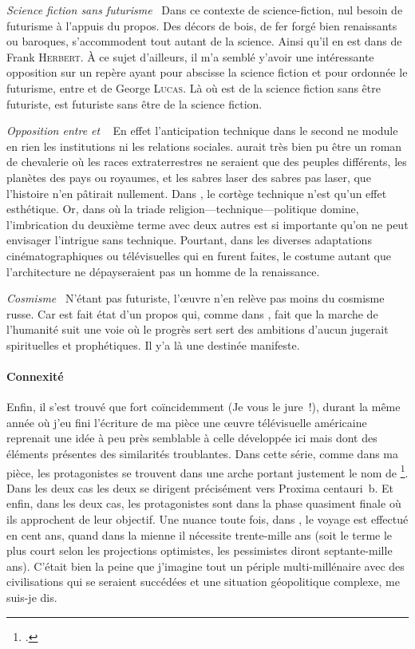   {\em\normalsize Science fiction sans futurisme}~
  Dans ce contexte de science-fiction, nul besoin de futurisme à l’appuis du propos. Des décors de bois, de fer forgé bien renaissants ou baroques, s’accommodent tout autant de la science. Ainsi qu’il en est dans  de Frank \textsc{Herbert}. À ce sujet d’ailleurs, il m’a semblé y’avoir une intéressante opposition sur un repère ayant pour abscisse la science fiction et pour ordonnée le futurisme, entre  et  de George \textsc{Lucas}. Là où  est de la science fiction sans être futuriste,  est futuriste sans être de la science fiction.

  {\em\normalsize Opposition entre  et }~
  En effet l’anticipation technique dans le second ne module en rien les institutions ni les relations sociales.  aurait très bien pu être un roman de chevalerie où les races extraterrestres ne seraient que des peuples différents, les planètes des pays ou royaumes, et les sabres laser des sabres pas laser, que l’histoire n’en pâtirait nullement. Dans , le cortège technique n’est qu’un effet esthétique.
  Or, dans  où la triade religion—technique—politique domine, l’imbrication du deuxième terme avec deux autres est si importante qu’on ne peut envisager l’intrigue sans technique. Pourtant, dans les diverses adaptations cinématographiques ou télévisuelles qui en furent faites, le costume autant que l’architecture ne dépayseraient pas un homme de la renaissance.

  {\em\normalsize Cosmisme}~
  N’étant pas futuriste, l’œuvre n’en relève pas moins du cosmisme russe. Car est fait état d’un propos qui, comme dans , fait que la marche de l’humanité suit une voie où le progrès sert sert des ambitions d’aucun jugerait spirituelles et prophétiques. Il y’a là une destinée manifeste.

  \paragraph{Connexité}
  Enfin, il s’est trouvé que fort coïncidemment (Je vous le jure !), durant la même année où j’eu fini l’écriture de ma pièce une œuvre télévisuelle américaine reprenait une idée à peu près semblable à celle développée ici mais dont des éléments présentes des similarités troublantes. Dans cette série, comme dans ma pièce, les protagonistes se trouvent dans une arche portant justement le nom de \footcite{theArk}. Dans les deux cas les deux se dirigent précisément vers Proxima centauri~b. Et enfin, dans les deux cas, les protagonistes sont dans la phase quasiment finale où ils approchent de leur objectif. 
  Une nuance toute fois, dans , le voyage est effectué en cent ans, quand dans la mienne il nécessite trente-mille ans (soit le terme le plus court selon les projections optimistes, les pessimistes diront septante-mille ans). C’était bien la peine que j’imagine tout un périple multi-millénaire avec des civilisations qui se seraient succédées et une situation géopolitique complexe, me suis-je dis.



